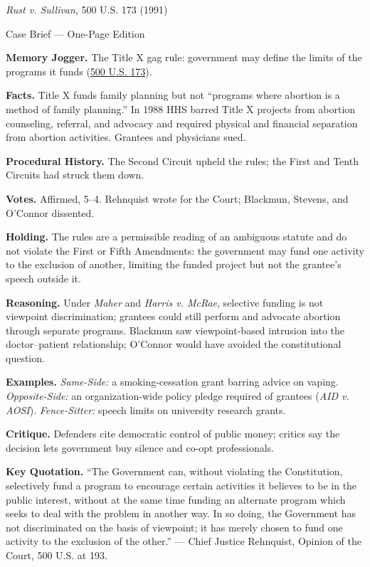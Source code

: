 \documentclass[12pt]{article}
\begin{document}
\begin{center}
{\Large \textit{Rust v. Sullivan}, 500 U.S. 173 (1991)\par}
\vspace{0.3em}
{\normalsize Case Brief --- One-Page Edition\par}
\end{center}

\textbf{Memory Jogger.} The Title X gag rule: government may define the limits of the programs it funds (\href{https://supreme.justia.com/cases/federal/us/500/173/}{500 U.S. 173}).

\textbf{Facts.} Title X funds family planning but not ``programs where abortion is a method of family planning.'' In 1988 HHS barred Title X projects from abortion counseling, referral, and advocacy and required physical and financial separation from abortion activities. Grantees and physicians sued.

\textbf{Procedural History.} The Second Circuit upheld the rules; the First and Tenth Circuits had struck them down.

\textbf{Votes.} Affirmed, 5--4. Rehnquist wrote for the Court; Blackmun, Stevens, and O'Connor dissented.

\textbf{Holding.} The rules are a permissible reading of an ambiguous statute and do not violate the First or Fifth Amendments: the government may fund one activity to the exclusion of another, limiting the funded project but not the grantee's speech outside it.

\textbf{Reasoning.} Under \textit{Maher} and \textit{Harris v. McRae}, selective funding is not viewpoint discrimination; grantees could still perform and advocate abortion through separate programs. Blackmun saw viewpoint-based intrusion into the doctor--patient relationship; O'Connor would have avoided the constitutional question.

\textbf{Examples.} \emph{Same-Side:} a smoking-cessation grant barring advice on vaping. \emph{Opposite-Side:} an organization-wide policy pledge required of grantees (\textit{AID v. AOSI}). \emph{Fence-Sitter:} speech limits on university research grants.

\textbf{Critique.} Defenders cite democratic control of public money; critics say the decision lets government buy silence and co-opt professionals.

\textbf{Key Quotation.} ``The Government can, without violating the Constitution, selectively fund a program to encourage certain activities it believes to be in the public interest, without at the same time funding an alternate program which seeks to deal with the problem in another way. In so doing, the Government has not discriminated on the basis of viewpoint; it has merely chosen to fund one activity to the exclusion of the other.'' --- Chief Justice Rehnquist, Opinion of the Court, 500 U.S. at 193.
\end{document}
